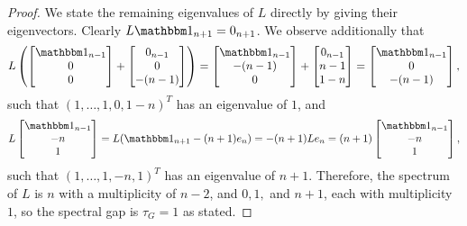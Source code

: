\begin{proof}
We state the remaining eigenvalues of $L$ directly by giving their eigenvectors.  Clearly $L \one_{n + 1} = 0_{n + 1}$.  We observe additionally that \[L\left(\begin{bmatrix} \one_{n - 1} \\ 0 \\ 0 \end{bmatrix} + \begin{bmatrix} 0_{n - 1} \\ 0 \\ -(n - 1) \end{bmatrix}\right)
= %
\begin{bmatrix} \one_{n - 1} \\ -(n - 1) \\ 0 \end{bmatrix} + \begin{bmatrix} 0_{n - 1} \\ n - 1 \\ 1 - n \end{bmatrix} = \begin{bmatrix} \one_{n - 1} \\ 0 \\ -(n - 1) \end{bmatrix} %
,\] such that %
$(1, \ldots, 1, 0, 1 - n)^T$ has an eigenvalue of $1$, and
\[ L\begin{bmatrix} \one_{n - 1} \\ -n \\ 1 \end{bmatrix} = L(\one_{n + 1} - (n + 1) e_n) = -(n + 1) L e_n = (n + 1) \begin{bmatrix} \one_{n - 1} \\ - n \\ 1 \end{bmatrix},\] such that %
$(1, \ldots, 1, -n, 1)^T$ has an eigenvalue of $n + 1$.  Therefore, the spectrum of $L$ is $n$ with a multiplicity of $n - 2$, and $0, 1,$ and $n + 1$, each with multiplicity $1$, so the spectral gap is $\tau_G = 1$ as stated.


\end{proof}
